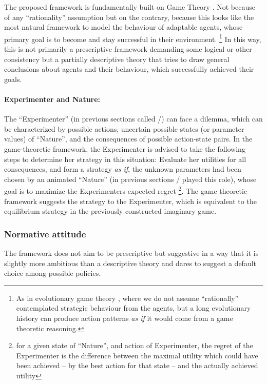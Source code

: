 \documentclass{article}
\theoremstyle{definition}
\begin{document}
The proposed framework is fundamentally built on Game Theory \cite{book:EssentialGameTheory,book:GameTheory,review:NeumannMorgensternGameThoery,book:GameTheoryOriginal}.
Not because of any ``rationality'' assumption but on the contrary, because this looks like the most natural framework to model the behaviour of adaptable agents, whose primary goal is to become and stay successful in their environment. \footnote{As in evolutionary game theory \cite{book:EvolutionaryGames,book:DarwinianDynamics}, where we do not assume ``rationally'' contemplated strategic behaviour from the agents, but a long evolutionary history can produce action patterns \emph{as if} it would come from a game theoretic reasoning.}
In this way, this is not primarily a prescriptive framework demanding some logical or other consistency but a partially descriptive theory that tries to draw general conclusions about agents and their behaviour, which successfully achieved their goals.

\paragraph{Experimenter and Nature:}
The ``Experimenter'' (in previous sections called \PI/) can face a dilemma, which can be characterized by possible actions, uncertain possible states (or parameter values) of ``Nature'', and the consequences of possible action-state pairs.
In the game-theoretic framework, the Experimenter is advised to take the following steps to determine her strategy in this situation:
Evaluate her utilities for all consequences, and form a strategy \emph{as if}, the unknown parameters had been chosen by an animated ``Nature'' (in previous sections \PII/ played this role), whose goal is to maximize the Experimenters expected regret \footnote{for a given state of ``Nature'', and action of Experimenter, the regret of the Experimenter is the difference between the maximal utility which could have been achieved -- by the best action for that state -- and the actually achieved utility}.
The game theoretic framework suggests the strategy to the Experimenter, which is equivalent to the equilibrium strategy in the previously constructed imaginary game. \cite{paper:Milnor,book:Wald,book:Savage}

\subsubsection{Normative attitude}

The framework does not aim to be prescriptive but suggestive in a way that it is slightly more ambitious than a descriptive theory and dares to suggest a default choice among possible policies.
\end{document}
